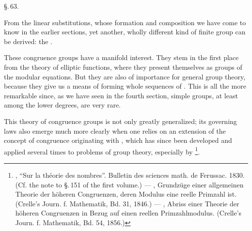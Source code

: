 


\S.\,63.


From the linear substitutions, whose formation and composition we have come to know in the earlier sections, yet another, wholly different kind of finite group can be derived: the .

These congruence groups have a manifold interest. They stem in the first place from the theory of elliptic functions, where they present themselves as  groups of the modular equations. But they are also of importance for general group theory, because they give us a means of forming whole sequences of . This is all the more remarkable since, as we have seen in the fourth section, simple groups, at least among the lower degrees, are very rare.

This theory of congruence groups is not only greatly generalized; its governing laws also emerge much more clearly when one relies on an extension of the concept of congruence originating with , which has since been developed and applied several times to problems of group theory, especially by \footnote{, ``Sur la théorie des nombres''. Bulletin des sciences math. de Ferussac. 1830. (Cf. the note to \S.\,151 of the first volume.) --- , Grundzüge einer allgemeinen Theorie der höheren Congruenzen, deren Modulus eine reelle Primzahl ist. (Crelle's Journ. f. Mathematik, Bd. 31, 1846.) --- , Abriss einer Theorie der höheren Congruenzen in Bezug auf einen reellen Primzahlmodulus. (Crelle's Journ. f. Mathematik, Bd. 54, 1856.)}.

